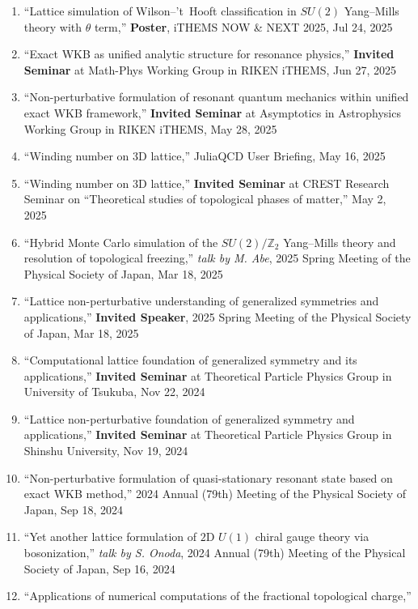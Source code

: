 \begin{enumerate}
       Strings and Fields 2025, Aug 1, 2025
 \item ``Lattice simulation of Wilson--'t~Hooft classification in $SU(2)$ Yang--Mills theory with $\theta$ term,''
       \textbf{Poster}, iTHEMS NOW \& NEXT 2025, Jul 24, 2025
 \item ``Exact WKB as unified analytic structure for resonance physics,''
       \textbf{Invited Seminar} at Math-Phys Working Group in RIKEN iTHEMS, Jun 27, 2025
 \item ``Non-perturbative formulation of resonant quantum mechanics within unified exact WKB framework,''
       \textbf{Invited Seminar} at Asymptotics in Astrophysics Working Group in RIKEN iTHEMS, May 28, 2025
 \item ``Winding number on 3D lattice,''
       JuliaQCD User Briefing, May 16, 2025
 \item ``Winding number on 3D lattice,''
       \textbf{Invited Seminar} at CREST Research Seminar on ``Theoretical studies of topological phases of matter,'' May 2, 2025
 \item ``Hybrid Monte Carlo simulation of the $SU(2)/\mathbb{Z}_2$ Yang--Mills theory and resolution of topological freezing,''
       \textit{talk by M. Abe},
       2025 Spring Meeting of the Physical Society of Japan, Mar 18, 2025
 \item ``Lattice non-perturbative understanding of generalized symmetries and applications,''
       \textbf{Invited Speaker},
       2025 Spring Meeting of the Physical Society of Japan, Mar 18, 2025
 \item ``Computational lattice foundation of generalized symmetry and its applications,''
       \textbf{Invited Seminar} at Theoretical Particle Physics Group in University of Tsukuba, Nov 22, 2024
 \item ``Lattice non-perturbative foundation of generalized symmetry and applications,''
       \textbf{Invited Seminar} at Theoretical Particle Physics Group in Shinshu University, Nov 19, 2024
 \item ``Non-perturbative formulation of quasi-stationary resonant state based on exact WKB method,''
       2024 Annual (79th) Meeting of the Physical Society of Japan, Sep 18, 2024
 \item ``Yet another lattice formulation of $2$D $U(1)$ chiral gauge theory via bosonization,''
       \textit{talk by S. Onoda},
       2024 Annual (79th) Meeting of the Physical Society of Japan, Sep 16, 2024
 \item ``Applications of numerical computations of the fractional topological charge,''

\end{enumerate}
